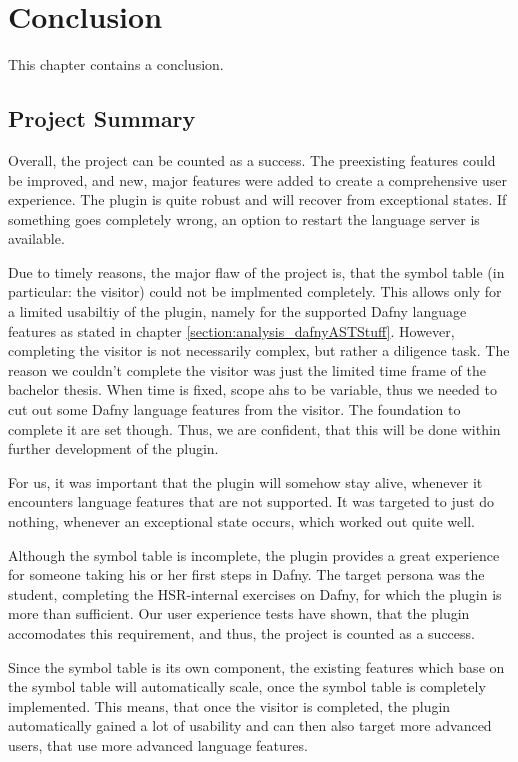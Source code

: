 \section{Conclusion}
\label{section:conclusion}

This chapter contains a conclusion. 

\subsection{Project Summary}
Overall, the project can be counted as a success.
The preexisting features could be improved, and new, major features were added to create a comprehensive user experience.
The plugin is quite robust and will recover from exceptional states.
If something goes completely wrong, an option to restart the language server is available.

Due to timely reasons, the major flaw of the project is, that the symbol table (in particular: the visitor) could not be implmented completely.
This allows only for a limited usabiltiy of the plugin, namely for the supported Dafny language features as stated in chapter \ref{section:analysis_dafnyASTStuff}.
However, completing the visitor is not necessarily complex, but rather a diligence task.
The reason we couldn't complete the visitor was just the limited time frame of the bachelor thesis.
When time is fixed, scope ahs to be variable, thus we needed to cut out some Dafny language features from the visitor. \cite{keller}
The foundation to complete it are set though.
Thus, we are confident, that this will be done within further development of the plugin.

For us, it was important that the plugin will somehow stay alive, whenever it encounters language features that are not supported.
It was targeted to just do nothing, whenever an exceptional state occurs, which worked out quite well.

Although the symbol table is incomplete, the plugin provides a great experience for someone taking his or her first steps in Dafny.
The target persona was the student, completing the HSR-internal exercises on Dafny, for which the plugin is more than sufficient.
Our user experience tests have shown, that the plugin accomodates this requirement, and thus, the project is counted as a success.

Since the symbol table is its own component, the existing features which base on the symbol table will automatically scale, once the symbol table is completely implemented.
This means, that once the visitor is completed, the plugin automatically gained a lot of usability and can then also target more advanced users, that use more advanced language features.

